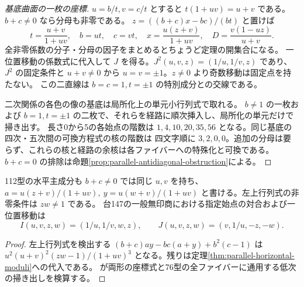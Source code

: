 \begin{proof}[基底曲面の一枚の座標]
$u=b/t,v=c/t$ とすると $t(1+uv)=u+v$ である。$b+c\ne0$ なら分母も非零である。
$z=((b+c)x-bc)/(bt)$ と置けば
\[
 t=\frac{u+v}{1+uv},\quad b=ut,\quad c=vt,\quad x=\frac{u(z+v)}{1+uv},\quad
 D=\frac{v(1-uz)}{u+v}.
\]
全非零係数の分子・分母の因子をまとめるとちょうど定理の開集合になる。
一位置移動の係数式に代入して $J$ を得る。$J^2(u,v,z)=(1/u,1/v,z)$ であり、
$J^2$ の固定条件と $u+v\ne0$ から $u=v=\pm1$。$z\ne0$ より奇数移動は固定点を持たない。
この二直線は $b=c=1,t=\pm1$ の特別成分との交線である。

二次関係の各色の像の基底は局所化上の単元小行列式で取れる。
$b\ne1$ の一枚および $b=1,t=\pm1$ の二枚で、それらを経路に順次挿入し、局所化の単元だけで掃き出す。
長さ0から5の各始点の階数は $1,4,10,20,35,56$ となる。同じ基底の四次・五次間の可換方程式の核の階数は
四文字順に $3,2,0,0$。追加の分母は要らず、これらの核と経路の余核は各ファイバーへの特殊化と可換である。
$b+c=0$ の排除は命題\ref{prop:parallel-antidiagonal-obstruction}による。
\end{proof}

\begin{corollary}
112型の水平主成分も $b+c\ne0$ では同じ $u,v$ を持ち、
$a=u(z+v)/(1+uv),\ y=u(w+v)/(1+uv)$ と書ける。左上行列式の非零条件は $zw\ne1$ である。
台147の一般無印商における指定始点の対合および一位置移動は
\[
 I(u,v,z,w)=(1/u,1/v,w,z),\qquad J(u,v,z,w)=(v,1/u,-z,-w).
\]
\end{corollary}
\begin{proof}
左上行列式を検出する $(b+c)ay-bc(a+y)+b^2(c-1)$ は
$u^2(u+v)^2(zw-1)/(1+uv)^3$ となる。残りは定理\ref{thm:parallel-horizontal-moduli}への代入である。
 が両形の座標式と76型の全ファイバーに通用する低次の掃き出しを検算する。
\end{proof}
